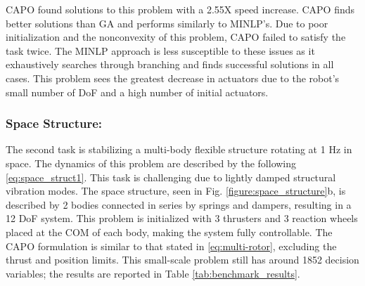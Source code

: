 \documentclass[runningheads]{llncs}
\begin{document}
    
CAPO found solutions to this problem with a 2.55X speed increase. CAPO finds better solutions than GA and performs similarly to MINLP's. Due to poor initialization and the nonconvexity of this problem, CAPO failed to satisfy the task twice. The MINLP approach is less susceptible to these issues as it exhaustively searches through branching and finds successful solutions in all cases. This problem sees the greatest decrease in actuators due to the robot's small number of DoF and a high number of initial actuators. 
\vspace{-15pt}
\subsubsection{Space Structure:}
The second task is stabilizing a multi-body flexible structure rotating at 1 Hz in space. The dynamics of this problem are described by the following \eqref{eq:space_struct1}. This task is challenging due to lightly damped structural vibration modes. %
The space structure, seen in Fig. \ref{figure:space_structure}b, is described by 2 bodies connected in series by springs and dampers, resulting in a 12 DoF system. This problem is initialized with 3 thrusters and 3 reaction wheels placed at the COM of each body, making the system fully controllable. The CAPO formulation is similar to that stated in \eqref{eq:multi-rotor}, excluding the thrust and position limits. This small-scale problem still has around 1852 decision variables; the results are reported in Table \ref{tab:benchmark_results}. 
\end{document}

